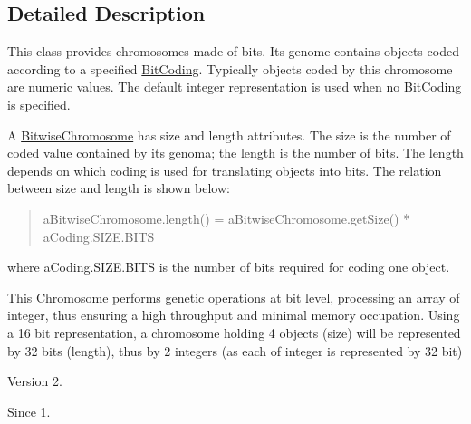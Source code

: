 \subsection{Detailed Description}
This class provides chromosomes made of bits. Its genome contains objects coded according to a specified \hyperlink{}{Bit\-Coding}. Typically objects coded by this chromosome are numeric values. The default integer representation is used when no Bit\-Coding is specified. 

A \hyperlink{classjenes_1_1chromosome_1_1_bitwise_chromosome}{Bitwise\-Chromosome} has size and length attributes. The size is the number of coded value contained by its genoma; the length is the number of bits. The length depends on which coding is used for translating objects into bits. The relation between size and length is shown below\-: 

\begin{quotation}

\begin{DoxyPre}
 aBitwiseChromosome.length() = aBitwiseChromosome.getSize() *  aCoding.SIZE.BITS
\end{DoxyPre}
\end{quotation}
where a\-Coding.\-S\-I\-Z\-E.\-B\-I\-T\-S is the number of bits required for coding one object. 

This Chromosome performs genetic operations at bit level, processing an array of integer, thus ensuring a high throughput and minimal memory occupation. Using a 16 bit representation, a chromosome holding 4 objects (size) will be represented by 32 bits (length), thus by 2 integers (as each of integer is represented by 32 bit)

\begin{DoxyVersion}{Version}
2. 
\end{DoxyVersion}
\begin{DoxySince}{Since}
1. 
\end{DoxySince}


